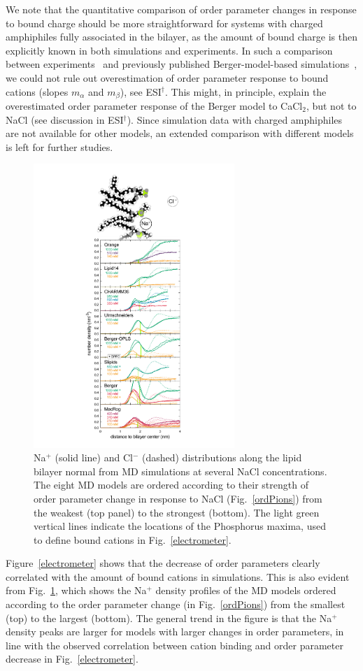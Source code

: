 \documentclass[twoside,twocolumn,9pt]{article}
\begin{document}
We note that
the quantitative comparison of order parameter changes in response to bound charge should be more straightforward for
systems with charged amphiphiles fully associated in the bilayer, as the amount of bound charge
is then explicitly known in both simulations and experiments. In such a comparison
between experiments~\cite{scherer89,franzin98} and previously published Berger-model-based simulations~\cite{miettinen09},
we could not rule out
overestimation of order parameter response to bound cations (slopes $m_\alpha$ and $m_\beta$), see ESI$^\dag$.
This might, in principle, explain the overestimated order parameter 
response of the Berger model to CaCl$_2$, but not to NaCl (see discussion in ESI$^\dag$).
Since simulation data with charged amphiphiles are not available for other models,
an extended comparison with different models is left for further studies.

\begin{figure}[!h]
  \centering
  \includegraphics[width=7.595cm]{../Fig/NaDensities_withSnap.pdf}
  \caption{\label{NAdensities}
    Na$^+$ (solid line) and Cl$^-$ (dashed) distributions along the lipid bi\-layer normal from MD simulations
    at several NaCl concentrations.
    The eight MD models are ordered according to their strength of order parameter change in response to NaCl
    (Fig.~\ref{ordPions})
    from the weakest (top panel) to the strongest (bottom).
    The light green vertical lines indicate the locations of the Phosphorus maxima,
    used to define bound cations in Fig.~\ref{electrometer}.
}
\end{figure}
%
Figure~\ref{electrometer} shows that the decrease of order parameters clearly correlated with the
amount of bound cations in simulations. This is also evident from Fig.~\ref{NAdensities},
which shows the Na$^+$ density profiles of the MD models ordered according to the order parameter change 
(in Fig.~\ref{ordPions}) from the smallest (top) to the largest (bottom).
The general trend in the figure is that the Na$^+$ density peaks are 
larger for models with larger changes in order parameters,
in line with the observed correlation between cation binding and order parameter decrease in
Fig.~\ref{electrometer}.
\end{document}
